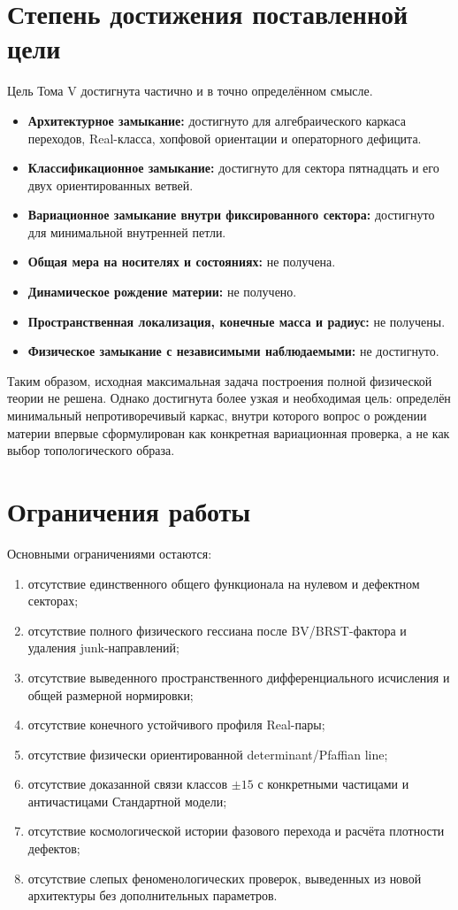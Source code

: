 \section*{Степень достижения поставленной цели}

Цель Тома V достигнута частично и в точно определённом смысле.

\begin{itemize}
 \item \textbf{Архитектурное замыкание:} достигнуто для алгебраического
 каркаса переходов, Real-класса, хопфовой ориентации и операторного
 дефицита.
 \item \textbf{Классификационное замыкание:} достигнуто для сектора
 пятнадцать и его двух ориентированных ветвей.
 \item \textbf{Вариационное замыкание внутри фиксированного сектора:}
 достигнуто для минимальной внутренней петли.
 \item \textbf{Общая мера на носителях и состояниях:} не получена.
 \item \textbf{Динамическое рождение материи:} не получено.
 \item \textbf{Пространственная локализация, конечные масса и радиус:}
 не получены.
 \item \textbf{Физическое замыкание с независимыми наблюдаемыми:}
 не достигнуто.
\end{itemize}

Таким образом, исходная максимальная задача построения полной физической
теории не решена. Однако достигнута более узкая и необходимая цель:
определён минимальный непротиворечивый каркас, внутри которого вопрос о
рождении материи впервые сформулирован как конкретная вариационная
проверка, а не как выбор топологического образа.

\section*{Ограничения работы}

Основными ограничениями остаются:
\begin{enumerate}
 \item отсутствие единственного общего функционала на нулевом и
 дефектном секторах;
 \item отсутствие полного физического гессиана после BV/BRST-фактора и
 удаления junk-направлений;
 \item отсутствие выведенного пространственного дифференциального
 исчисления и общей размерной нормировки;
 \item отсутствие конечного устойчивого профиля Real-пары;
 \item отсутствие физически ориентированной determinant/Pfaffian line;
 \item отсутствие доказанной связи классов $\pm15$ с конкретными
 частицами и античастицами Стандартной модели;
 \item отсутствие космологической истории фазового перехода и расчёта
 плотности дефектов;
 \item отсутствие слепых феноменологических проверок, выведенных из новой
 архитектуры без дополнительных параметров.
\end{enumerate}

